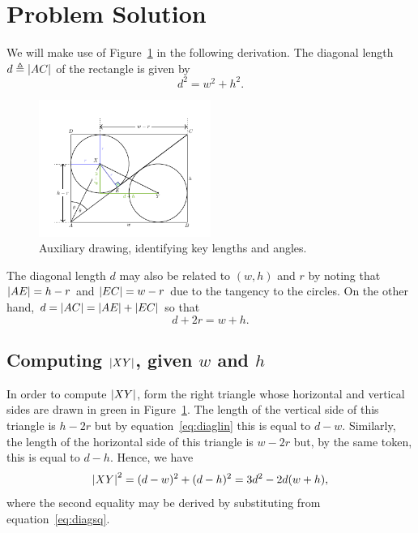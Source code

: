 \section{Problem Solution}
\label{sec:solution}

We will make use of Figure~\ref{fig:solution} in the following derivation.
The diagonal length $d \triangleq \left|{AC}\right|$ of the rectangle is given by 
%
\begin{equation}
  d^2 = w^2 + h^2.
  \label{eq:diagsq}
\end{equation}
%
\begin{figure}[h]
  \centering
  \includegraphics[trim={0 0 0 0.55cm},clip,width=0.5\textwidth]{./figures/basic2.pdf}
  \vspace{-8mm}
  \caption{Auxiliary drawing, identifying key lengths and angles.}
  \label{fig:solution}
\end{figure}
%
The diagonal length $d$ may also be related to $(w,h)$ and $r$ by noting that
$\left|{AE}\right| = h-r$ and $\left|{EC}\right| = w-r$ due to the tangency to the circles. On the
other hand, $d = \left|{AC}\right| = \left|{AE}\right| + \left|{EC}\right|$ so that 
%
\begin{equation}
  d + 2r = w + h.
  \label{eq:diaglin}
\end{equation}

\subsection{Computing $\left|{XY}\right|$, given $w$ and $h$}
\label{ssec:compute_xy}

In order to compute $\left|{XY}\right|$, form the right triangle whose horizontal and
vertical sides are drawn in green in Figure~\ref{fig:solution}. The length of
the vertical side of this triangle is $h-2r$ but by equation~\eqref{eq:diaglin}
this is equal to $d-w$. Similarly, the length of the horizontal side of this
triangle is $w-2r$ but, by the same token, this is equal to $d-h$. Hence, we
have
%
\begin{equation}
  \left|{XY}\right|^2 = (d-w)^2 + (d-h)^2 = 3d^2 - 2d(w+h),
  \label{eq:xylen}
\end{equation}
%
where the second equality may be derived by substituting from
equation~\eqref{eq:diagsq}.

